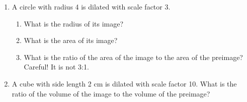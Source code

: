 \begin{enumerate}
    \wbnewpage
    \item A circle with radius 4 is dilated with scale factor 3.
        \begin{enumerate}
            \item What is the radius of its image?\wbvfill
            \item What is the area of its image?\wbvfill
            \item What is the ratio of the area of the image to the area of the preimage? Careful! It is not 3:1.\wbvfill
        \end{enumerate}
    \item A cube with side length 2 cm is dilated with scale factor 10. What is the ratio of the volume of the image to the volume of the preimage?\wbvfill
\end{enumerate}

\wbnewpage
